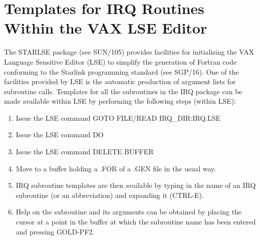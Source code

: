 \newpage
{}
\newpage

\section{Templates for IRQ Routines Within the VAX LSE Editor}
The STARLSE package (see SUN/105) provides facilities for initialising the VAX
Language Sensitive Editor (LSE) to simplify the generation of Fortran
code conforming to the Starlink programming standard (see SGP/16). One of the
facilities provided by LSE is the automatic production of argument lists for
subroutine calls. Templates for all the subroutines in the IRQ package can be
made available within LSE by performing the following steps (within LSE):
\begin{enumerate}
\item Issue the LSE command GOTO FILE/READ IRQ\_DIR:IRQ.LSE
\item Issue the LSE command DO
\item Issue the LSE command DELETE BUFFER
\item Move to a buffer holding a .FOR of a .GEN file in the usual way.
\item IRQ subroutine templates are then available by typing in the name of an
IRQ subroutine (or an abbreviation) and expanding it (CTRL-E).
\item Help on the subroutine and its arguments can be obtained by placing the
cursor at a point in the buffer at which the subroutine name has been entered
and pressing GOLD-PF2.
\end{enumerate}

